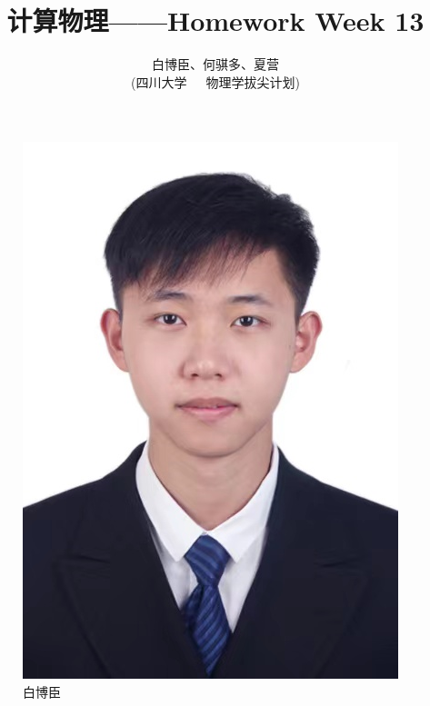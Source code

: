 \documentclass[12pt,a4paper]{article}%
\title{\fontsize{18pt}{27pt}\selectfont%
    {\heiti%
        计算物理——Homework Week 13}}%
\author{\fontsize{12pt}{18pt}\selectfont%
    {\fangsong%
        白博臣、何骐多、夏营}\\%
    \fontsize{10.5pt}{15.75pt}\selectfont%
    {\fangsong%
        (四川大学~~~物理学拔尖计划)}}%
\date{}%
\begin{document}
\maketitle%
\lhead{}%
\chead{}%
\rhead{}%
\lfoot{}%
\cfoot{\thepage}%
\rfoot{}%
\begin{figure}[h]
    \centering
    \begin{minipage}{0.32\textwidth}
        \centering
        \includegraphics[width=\linewidth]{bbc}
        \caption{白博臣}
        \label{白博臣照片}
    \end{minipage}\hfill
    \begin{minipage}{0.305\textwidth}

\end{minipage}
\end{figure}
\end{document}
